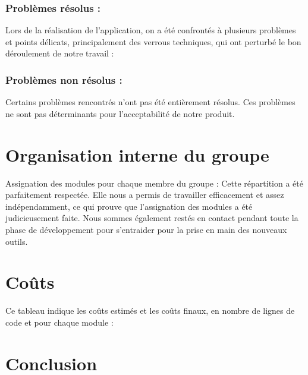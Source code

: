 			\subsubsection*{Problèmes résolus :} 
			Lors de la réalisation de l'application, on a été confrontés à plusieurs problèmes et points délicats, principalement des verrous techniques, qui ont perturbé le bon déroulement de notre travail :
				
			\subsubsection*{Problèmes non résolus :}
				Certains problèmes rencontrés n'ont pas été entièrement résolus. Ces problèmes ne sont pas déterminants pour l'acceptabilité de notre produit.
				
	\section{Organisation interne du groupe}
	Assignation des modules pour chaque membre du groupe :
	Cette répartition a été parfaitement respectée. Elle nous a permis de travailler efficacement et assez indépendamment, ce qui prouve que l'assignation des modules a été judicieusement faite. Nous sommes également restés en contact pendant toute la phase de développement pour s'entraider pour la prise en main des nouveaux outils.
	
	\section{Coûts}
	Ce tableau indique les coûts estimés et les coûts finaux, en nombre de lignes de code et pour chaque module :
	
	\section*{Conclusion}
		

